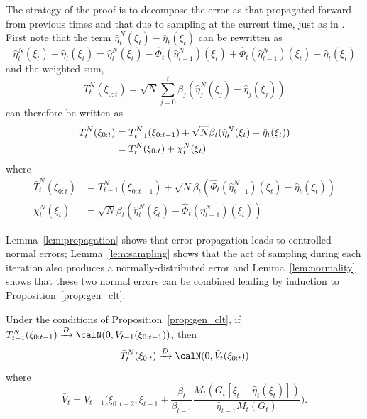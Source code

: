 The strategy of the proof is to decompose the error as that propagated forward
from previous times and that due to sampling at the current time, just as in
\cite{DelMoral:2004ux}.  First note that the term
$\hat\eta_t^N(\xi_t)-\hat\eta_t(\xi_t)$ can be rewritten as
\begin{equation}
  \hat\eta_t^N(\xi_t)-\hat\eta_t(\xi_t) =
  \hat\eta_t^N(\xi_t) - \hat\Phi_t(\hat\eta_{t-1}^N)(\xi_t) +
  \hat\Phi_t(\hat\eta_{t-1}^N)(\xi_t) - \hat\eta_t(\xi_t)
\end{equation}
and the weighted sum,
\begin{equation}
  T_t^N(\xi_{0:t}) =\sqrt{N}
  \sum_{j=0}^t\beta_j(\hat\eta_j^N(\xi_j)-\hat\eta_j(\xi_j))
\end{equation}
can therefore be written as
\begin{align}
  T_t^N(\xi_{0:t}) &= T_{t-1}^N(\xi_{0:t-1}) +
  \sqrt{N}\beta_t(\hat\eta_t^N(\xi_t)-\hat\eta_t(\xi_t)) \notag\\
  &= \bar{T}_t^N(\xi_{0:t}) + \chi_t^N(\xi_t)
\end{align}
where
\begin{align}
  \bar{T}_t^N(\xi_{0:t}) &= T_{t-1}^N(\xi_{0:t-1}) +
  \sqrt{N}\beta_t(\hat\Phi_t(\hat\eta_{t-1}^N)(\xi_t) - \hat\eta_t(\xi_t))
  \label{eq:bar_t_t} \\
  \chi_t^N(\xi_t) &=
  \sqrt{N}\beta_t(\hat\eta_t^N(\xi_t) - \hat\Phi_t(\eta_{t-1}^N)(\xi_t))
\end{align}

Lemma~\ref{lem:propagation} shows that error propagation leads to controlled
normal errors; Lemma~\ref{lem:sampling} shows that the act of sampling during
each iteration also produces a normally-distributed error and
Lemma~\ref{lem:normality} shows that these two normal errors can be combined
leading by induction to Proposition~\ref{prop:gen_clt}.

\begin{lemma}\label{lem:propagation}
  Under the conditions of Proposition~\ref{prop:gen_clt}, if
  $T_{t-1}^N(\xi_{0:t-1})\xrightarrow{D}\calN(0,V_{t-1}(\xi_{0:t-1}))$, then
  \begin{equation}
    \bar{T}_t^N(\xi_{0:t})\xrightarrow{D}\calN(0, \bar{V}_t(\xi_{0:t}))
  \end{equation}
  where
  \begin{equation}
    \bar{V}_t = V_{t-1}\biggl(\xi_{0:t-2}, \xi_{t-1} +
    \frac{\beta_t}{\beta_{t-1}}
    \frac{M_t(G_t[\xi_t-\hat\eta_t(\xi_t)])}{\hat\eta_{t-1}M_t(G_t)}\biggr).
  \end{equation}
\end{lemma}

